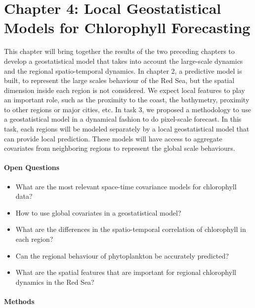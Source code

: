 \section{Chapter 4: Local Geostatistical Models for Chlorophyll Forecasting}

This chapter will bring together the results of the two preceding chapters to
develop a geostatistical model that takes into account the large-scale dynamics
and the regional spatio-temporal dynamics. In chapter 2, a predictive model is
built, to represent the large scales behaviour of the Red Sea, but the
spatial dimension inside each region is not considered. We expect local
features to play an important role, such as the proximity to the coast, the
bathymetry, proximity to other regions or major cities, etc. In task 3, we
proposed a methodology to use a geostatistical model in a dynamical fashion to
do pixel-scale forecast. In this task, each regions will be modeled separately
by a local geostatistical model that can provide local prediction. These models
will have access to aggregate covariates from neighboring regions to represent
the global scale behaviours. 

\paragraph{Open Questions}

\begin{itemize}

\item What are the most relevant space-time covariance models for chlorophyll
data?

\item How to use global covariates in a geostatistical model?

\item What are the differences in the spatio-temporal correlation of
chlorophyll in each region?

\item Can the regional behaviour of phytoplankton be accurately predicted?

\item What are the spatial features that are important for regional chlorophyll
dynamics in the Red Sea?

\end{itemize}

\paragraph{Methods}


